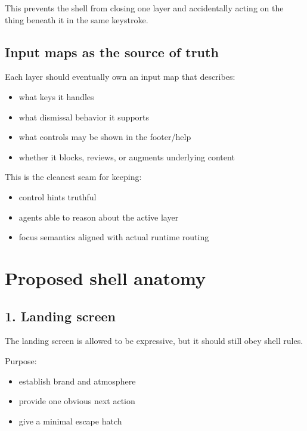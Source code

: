 This prevents the shell from closing one layer and accidentally acting on the thing beneath it in the same keystroke.

\subsection{Input maps as the source of truth}\label{record-047-input-maps-as-the-source-of-truth}

Each layer should eventually own an input map that describes:

\begin{itemize}
\tightlist
\item
  what keys it handles
\item
  what dismissal behavior it supports
\item
  what controls may be shown in the footer/help
\item
  whether it blocks, reviews, or augments underlying content
\end{itemize}

This is the cleanest seam for keeping:

\begin{itemize}
\tightlist
\item
  control hints truthful
\item
  agents able to reason about the active layer
\item
  focus semantics aligned with actual runtime routing
\end{itemize}

\section{Proposed shell anatomy}\label{record-047-proposed-shell-anatomy}

\subsection{1. Landing screen}\label{record-047-landing-screen}

The landing screen is allowed to be expressive, but it should still obey shell rules.

Purpose:

\begin{itemize}
\tightlist
\item
  establish brand and atmosphere
\item
  provide one obvious next action
\item
  give a minimal escape hatch
\end{itemize}

